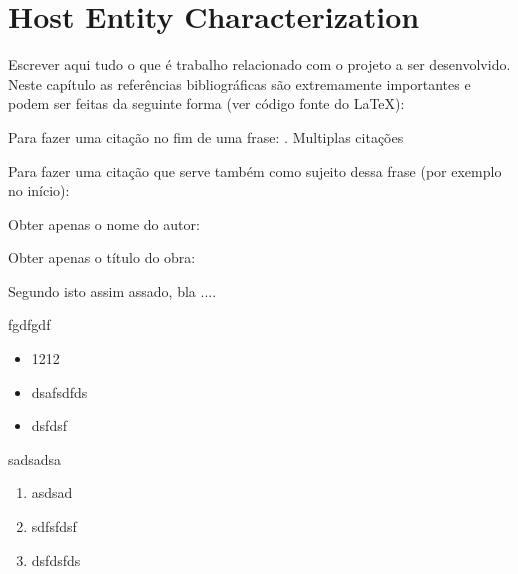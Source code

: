 
\chapter{Host Entity Characterization}
\label{ch:background}


Escrever aqui tudo o que é trabalho relacionado com o projeto a ser desenvolvido. Neste capítulo as referências bibliográficas são extremamente importantes e podem ser feitas da seguinte forma (ver código fonte do \LaTeX): 

Para fazer uma citação no fim de uma frase: \parencite{Sims1992}. Multiplas citações \parencite{Darwin1859,Koza1992}

Para fazer uma citação que serve também como sujeito dessa frase (por exemplo no início): \textcite{Sims1992}

Obter apenas o nome do autor: \citeauthor{Sims1992}

Obter apenas o título do obra:  


Segundo \textcite{Rudolph2016} isto assim assado, bla .... 


fgdfgdf
\begin{itemize}
    \item 1212
    \item dsafsdfds
    \item dsfdsf
\end{itemize}

sadsadsa
\begin{enumerate}
    \item asdsad
    \item sdfsfdsf
    \item dsfdsfds
\end{enumerate}

